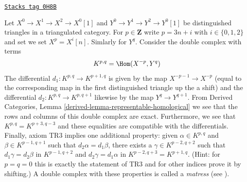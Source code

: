 \begin{remark}[Matress]
\label{equiv-remark-matress}
\href{https://stacks.math.columbia.edu/tag/0H8B}{\texttt{Stacks tag 0H8B}}

Let $X^0 \to X^1 \to X^2 \to X^0[1]$ and $Y^0 \to Y^1 \to Y^2 \to Y^0[1]$
be distinguished triangles in a triangulated category. For
$p \in \mathbf{Z}$ write $p = 3n + i$ with $i \in \{0, 1, 2\}$ and set
we set $X^p = X^i[n]$. Simlarly for $Y^q$. Consider the double complex
with terms
$$
K^{p, q} = \Hom(X^{-p}, Y^q)
$$
The differential $d_1 : K^{p, q} \to K^{p + 1, q}$ is given by the map
$X^{-p - 1} \to X^{-p}$ (equal to the corresponding map
in the first distinguished triangle up the a shift)
and the differential $d_2 : K^{p, q} \to K^{p, q + 1}$ likewise
by the map $Y^q \to Y^{q + 1}$. From
Derived Categories, Lemma \ref{derived-lemma-representable-homological}
we see that the rows and columns of this double complex are exact.
Furthermore, we see that $K^{p, q} = K^{p + 3, q - 3}$ and these
equalities are compatible with the differentials. Finally, axiom TR3
implies one additional property: given
$\alpha \in K^{p, q}$ and $\beta \in K^{p - 1, q + 1}$ such
that $d_2 \alpha = d_1 \beta$, there exists a $\gamma \in K^{p - 2, q + 2}$
such that
$d_1 \gamma = d_2 \beta $ in $K^{p - 1, q + 2}$ and
$d_2 \gamma = d_1 \alpha $ in $K^{p - 2, q + 3} = K^{p + 1, q}$.
(Hint: for $p = q = 0$ this is exactly the statement of TR3
and for other indices prove it by shifting.)
A double complex with these properties is called a {\it matress}
(see \cite{Bondal-Kapranov}).
\end{remark}

